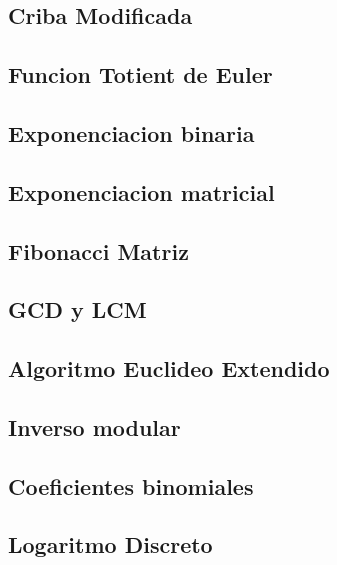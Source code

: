 \subsection{Criba Modificada}
\raggedbottom
\hrulefill
\subsection{Funcion Totient de Euler}
\raggedbottom
\hrulefill
\subsection{Exponenciacion binaria}
\raggedbottom
\hrulefill
\subsection{Exponenciacion matricial}
\raggedbottom
\hrulefill
\subsection{Fibonacci Matriz}
\raggedbottom
\hrulefill
\subsection{GCD y LCM}
\raggedbottom
\hrulefill
\subsection{Algoritmo Euclideo Extendido}
\raggedbottom
\hrulefill
\subsection{Inverso modular}
\raggedbottom
\hrulefill
\subsection{Coeficientes binomiales}
\raggedbottom
\hrulefill
\subsection{Logaritmo Discreto}
\raggedbottom
\hrulefill
